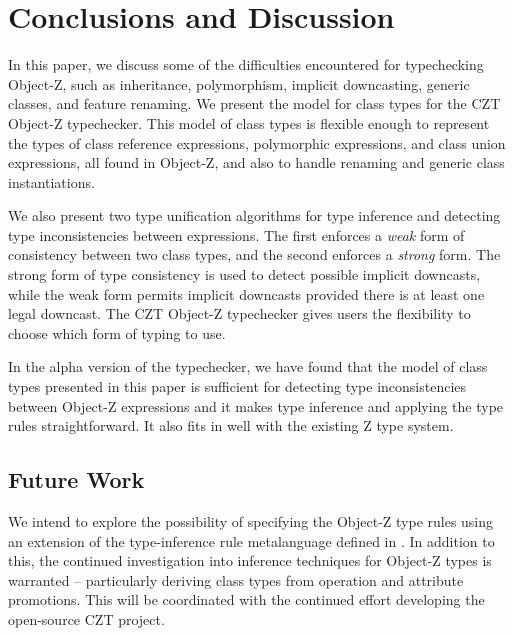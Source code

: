 \section{Conclusions and Discussion}

In this paper, we discuss some of the difficulties encountered for
typechecking Object-Z, such as inheritance, polymorphism, implicit
downcasting, generic classes, and feature renaming. We present the
model for class types for the CZT Object-Z typechecker. This model of
class types is flexible enough to represent the types of class
reference expressions, polymorphic expressions, and class union
expressions, all found in Object-Z, and also to handle renaming and
generic class instantiations.

We also present two type unification algorithms for type inference and
detecting type inconsistencies between expressions. The first enforces
a {\em weak} form of consistency between two class types, and the
second enforces a {\em strong} form. The strong form of type
consistency is used to detect possible implicit downcasts, while the
weak form permits implicit downcasts provided there is at least one
legal downcast. The CZT Object-Z typechecker gives users the
flexibility to choose which form of typing to use.

In the alpha version of the typechecker, we have found that the model
of class types presented in this paper is sufficient for detecting
type inconsistencies between Object-Z expressions and it makes type
inference and applying the type rules straightforward. It also fits in
well with the existing Z type system.

\subsection{Future Work}

We intend to explore the possibility of specifying the Object-Z type rules
using an extension of the type-inference rule metalanguage defined in 
\theStandard \cite{isoz}. In addition to this, the continued investigation
into inference techniques for Object-Z types is warranted -- particularly
deriving class types from operation and attribute promotions. 
This will be coordinated with the continued effort developing the
open-source CZT project.
